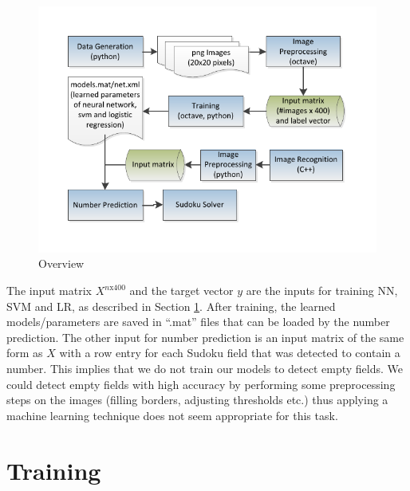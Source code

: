 \documentclass{article}
\begin{document}
\begin{figure}[ht]
	\centerline{\includegraphics[width=\columnwidth, trim=25 30 25 30]{../overview}}
	\caption{Overview}
	\label{fig:overview}
\end{figure}
The input matrix $X^{n\text{x}400}$ and the target vector $y$ are the inputs for training NN, SVM and LR, as described in Section \ref{training}. After training, the learned models/parameters are saved in ``.mat'' files that can be loaded by the number prediction. The other input for number prediction is an input matrix of the same form as $X$ with a row entry for each Sudoku field that was detected to contain a number. This implies that we do not train our models to detect empty fields. We could detect empty fields with high accuracy by performing some preprocessing steps on the images (filling borders, adjusting thresholds etc.) thus applying a machine learning technique does not seem appropriate for this task.

\section{Training}
\label{training}
\end{document}
